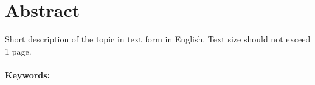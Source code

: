 \documentclass[../main.tex]{subfiles}
\begin{document}
    

\section*{Abstract}  

Short description of the topic in text form in English. Text size should not exceed 1 page.\\
\hrulefill
\\
\textbf{Keywords:} 
\end{document}

